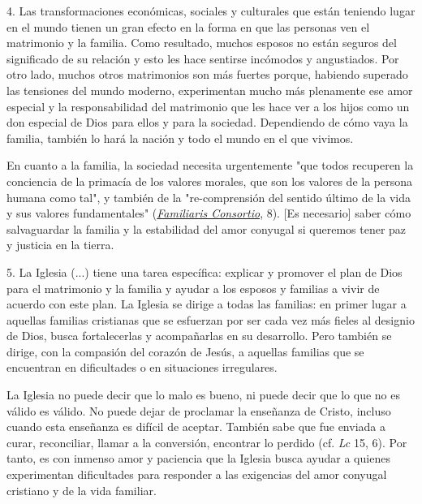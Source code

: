 4. Las transformaciones económicas, sociales y culturales que están
teniendo lugar en el mundo tienen un gran efecto en la forma en que las
personas ven el matrimonio y la familia. Como resultado, muchos esposos
no están seguros del significado de su relación y esto les hace sentirse
incómodos y angustiados. Por otro lado, muchos otros matrimonios son más
fuertes porque, habiendo superado las tensiones del mundo moderno,
experimentan mucho más plenamente ese amor especial y la responsabilidad
del matrimonio que les hace ver a los hijos como un don especial de Dios
para ellos y para la sociedad. Dependiendo de cómo vaya la familia,
también lo hará la nación y todo el mundo en el que vivimos.

En cuanto a la familia, la sociedad necesita urgentemente "que todos
recuperen la conciencia de la primacía de los valores morales, que son
los valores de la persona humana como tal", y también de la
"re-comprensión del sentido último de la vida y sus valores
fundamentales"
(\href{http://www.vatican.va/content/john-paul-ii/it/apost_exhortations/documents/hf_jp-ii_exh_19811122_familiaris-consortio.html}{\emph{\emph{Familiaris
			Consortio}}}, 8). {[}Es necesario{]} saber cómo salvaguardar la familia
y la estabilidad del amor conyugal si queremos tener paz y justicia en
la tierra.

5. La Iglesia (...) tiene una tarea específica: explicar y promover el
plan de Dios para el matrimonio y la familia y ayudar a los esposos y
familias a vivir de acuerdo con este plan. La Iglesia se dirige a todas
las familias: en primer lugar a aquellas familias cristianas que se
esfuerzan por ser cada vez más fieles al designio de Dios, busca
fortalecerlas y acompañarlas en su desarrollo. Pero también se dirige,
con la compasión del corazón de Jesús, a aquellas familias que se
encuentran en dificultades o en situaciones irregulares.

La Iglesia no puede decir que lo malo es bueno, ni puede decir que lo
que no es válido es válido. No puede dejar de proclamar la enseñanza de
Cristo, incluso cuando esta enseñanza es difícil de aceptar. También
sabe que fue enviada a curar, reconciliar, llamar a la conversión,
encontrar lo perdido (cf. \emph{Lc} 15, 6). Por tanto, es con inmenso
amor y paciencia que la Iglesia busca ayudar a quienes experimentan
dificultades para responder a las exigencias del amor conyugal cristiano
y de la vida familiar.

